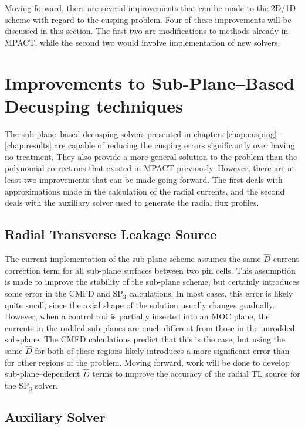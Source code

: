 Moving forward, there are several improvements that can be made to the 2D/1D scheme with regard to the cusping problem.  Four of these improvements will be discussed in this section.  The first two are modifications to methods already in MPACT, while the second two would involve implementation of new solvers.

\section{Improvements to Sub-Plane--Based Decusping techniques}

The sub-plane--based decusping solvers presented in chapters \ref{chap:cusping}-\ref{chap:results} are capable of reducing the cusping errors significantly over having no treatment.  They also provide a more general solution to the problem than the polynomial corrections that existed in MPACT previously.  However, there are at least two improvements that can be made going forward.  The first deals with approximations made in the calculation of the radial currents, and the second deals with the auxiliary solver used to generate the radial flux profiles.

\subsection{Radial Transverse Leakage Source}

The current implementation of the sub-plane scheme assumes the same $\hat{D}$ current correction term for all sub-plane surfaces between two pin cells.  This assumption is made to improve the stability of the sub-plane scheme, but certainly introduces some error in the CMFD and SP$_3$ calculations.  In most cases, this error is likely quite small, since the axial shape of the solution usually changes gradually.  However, when a control rod is partially inserted into an MOC plane, the currents in the rodded sub-planes are much different from those in the unrodded sub-plane.  The CMFD calculations predict that this is the case, but using the same $\hat{D}$ for both of these regions likely introduces a more significant error than for other regions of the problem.  Moving forward, work will be done to develop sub-plane--dependent $\hat{D}$ terms to improve the accuracy of the radial TL source for the SP$_3$ solver.

\subsection{Auxiliary Solver}

